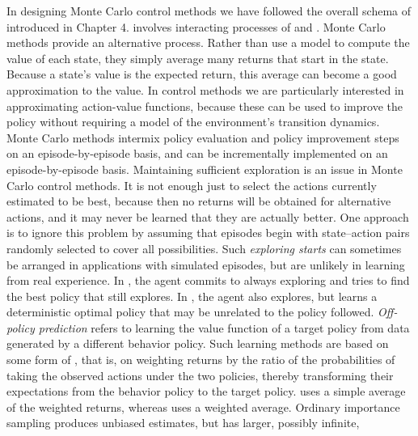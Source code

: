 In designing Monte Carlo control methods we have followed the overall schema of
 introduced in Chapter 4.
 involves interacting processes of
 and
.
Monte Carlo methods provide an alternative 
process.
Rather than use a model to compute the value of each state, they simply average many returns
that start in the state.
Because a state’s value is the expected return, this average can become a good approximation
to the value.
In control methods we are particularly interested in approximating action-value functions,
because these can be used to improve the policy without requiring a model of the
environment’s transition dynamics.
Monte Carlo methods intermix policy evaluation and policy improvement steps on an
episode-by-episode basis, and can be incrementally implemented on an episode-by-episode basis.
Maintaining sufficient exploration is an issue in Monte Carlo control methods.
It is not enough just to select the actions currently estimated to be best, because then no
returns will be obtained for alternative actions, and it may never be learned that they
are actually better.
One approach is to ignore this problem by assuming that episodes begin with state–action pairs
randomly selected to cover all possibilities.
Such \emph{exploring starts} can sometimes be arranged in applications with simulated episodes,
but are unlikely in learning from real experience.
In , the agent commits to always exploring and tries to find the
best policy that still explores.
In , the agent also explores, but learns a deterministic optimal policy that
may be unrelated to the policy followed.
\emph{Off-policy prediction} refers to learning the value function of a target policy from data
generated by a different behavior policy.
Such learning methods are based on some form of
, that is,
on weighting returns by the ratio of the probabilities of taking the observed actions under
the two policies, thereby transforming their expectations from the behavior policy to the
target policy.
 uses a simple average of
the weighted returns, whereas
 uses a weighted average.
Ordinary importance sampling produces unbiased estimates, but has larger, possibly infinite,
